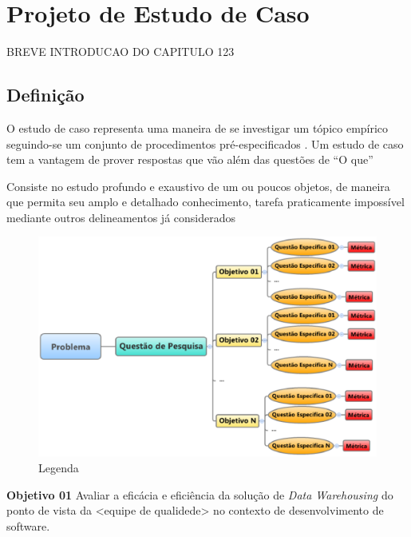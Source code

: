 \chapter{Projeto de Estudo de Caso}
\label{chap:proj-est-caso}

BREVE INTRODUCAO DO CAPITULO \cite{yin2001estudo} 123

\section{Definição}

O estudo de caso representa uma maneira de se investigar um tópico empírico seguindo-se um conjunto de procedimentos pré-especificados . Um estudo de caso tem a vantagem de prover respostas que vão além das questões de ``O que''

Consiste no estudo profundo e exaustivo de um ou poucos objetos, de maneira que permita seu amplo e detalhado conhecimento, tarefa praticamente impossível mediante outros delineamentos já considerados

\begin{figure}[h!]
\centering
\includegraphics[keepaspectratio=false,scale=0.75]{figuras/figuras_pedro/estrut-estudo-caso.eps}
\caption{ Legenda }
\label{fig:estrut-est-caso}
\end{figure}
\FloatBarrier


\textbf{Objetivo 01} Avaliar a eficácia e eficiência da solução de \textit{Data Warehousing} do ponto de vista da <equipe de qualidede> no contexto de desenvolvimento de software. \newline

